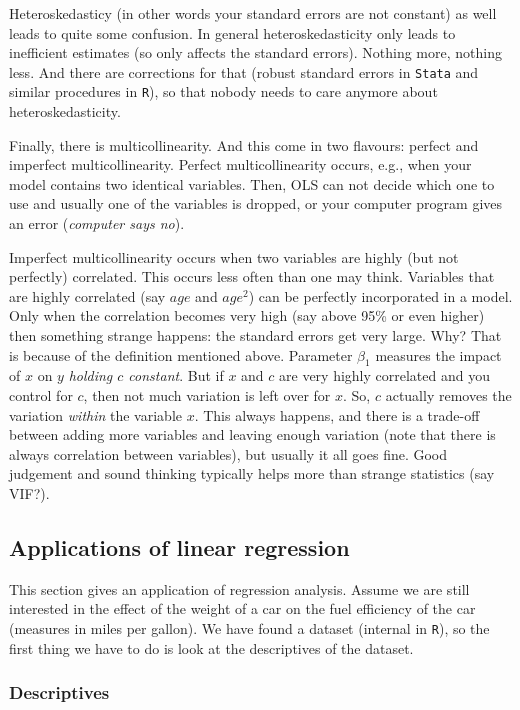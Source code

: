 \documentclass[]{article}
\begin{document}
Heteroskedasticy (in other words your standard errors are not constant)
as well leads to quite some confusion. In general heteroskedasticity
only leads to inefficient estimates (so only affects the standard
errors). Nothing more, nothing less. And there are corrections for that
(robust standard errors in \texttt{Stata} and similar procedures in
\texttt{R}), so that nobody needs to care anymore about
heteroskedasticity.

Finally, there is multicollinearity. And this come in two flavours:
perfect and imperfect multicollinearity. Perfect multicollinearity
occurs, e.g., when your model contains two identical variables. Then,
OLS can not decide which one to use and usually one of the variables is
dropped, or your computer program gives an error (\emph{computer says
no}).

Imperfect multicollinearity occurs when two variables are highly (but
not perfectly) correlated. This occurs less often than one may think.
Variables that are highly correlated (say \(age\) and \(age^2\)) can be
perfectly incorporated in a model. Only when the correlation becomes
very high (say above 95\% or even higher) then something strange
happens: the standard errors get very large. Why? That is because of the
definition mentioned above. Parameter \(\beta_1\) measures the impact of
\(x\) on \(y\) \emph{holding \(c\) constant}. But if \(x\) and \(c\) are
very highly correlated and you control for \(c\), then not much
variation is left over for \(x\). So, \(c\) actually removes the
variation \emph{within} the variable \(x\). This always happens, and
there is a trade-off between adding more variables and leaving enough
variation (note that there is always correlation between variables), but
usually it all goes fine. Good judgement and sound thinking typically
helps more than strange statistics (say VIF?).

\subsection{Applications of linear regression}\label{sec:applications}

This section gives an application of regression analysis. Assume we are
still interested in the effect of the weight of a car on the fuel
efficiency of the car (measures in miles per gallon). We have found a
dataset (internal in \texttt{R}), so the first thing we have to do is
look at the descriptives of the dataset.

\subsubsection{Descriptives}\label{descriptives}
\end{document}

